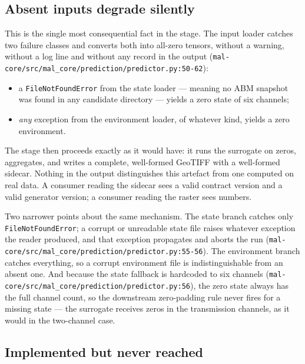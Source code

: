 \documentclass[11pt,a4paper]{article}
\newcommand{\code}[1]{\texttt{#1}}
\begin{document}
\subsection{Absent inputs degrade silently}
\label{sec:absent-inputs}

This is the single most consequential fact in the stage. The input loader
catches two failure classes and converts both into all-zero tensors, without
a warning, without a log line and without any record in the output
(\code{mal-core/src/mal\_core/prediction/predictor.py:50-62}):

\begin{itemize}
\item a \code{FileNotFoundError} from the state loader --- meaning no ABM
  snapshot was found in any candidate directory --- yields a zero state of
  six channels;
\item \emph{any} exception from the environment loader, of whatever kind,
  yields a zero environment.
\end{itemize}

The stage then proceeds exactly as it would have: it runs the surrogate on
zeros, aggregates, and writes a complete, well-formed GeoTIFF with a
well-formed sidecar. Nothing in the output distinguishes this artefact from
one computed on real data. A consumer reading the sidecar sees a valid
contract version and a valid generator version; a consumer reading the raster
sees numbers.

Two narrower points about the same mechanism. The state branch catches only
\code{FileNotFoundError}; a corrupt or unreadable state file raises whatever
exception the reader produced, and that exception propagates and aborts the
run (\code{mal-core/src/mal\_core/prediction/predictor.py:55-56}). The
environment branch catches everything, so a corrupt environment file is
indistinguishable from an absent one. And because the state fallback is
hardcoded to six channels
(\code{mal-core/src/mal\_core/prediction/predictor.py:56}), the zero state
always has the full channel count, so the downstream zero-padding rule never
fires for a missing state --- the surrogate receives zeros in the
transmission channels, as it would in the two-channel case.

\subsection{Implemented but never reached}
\end{document}
